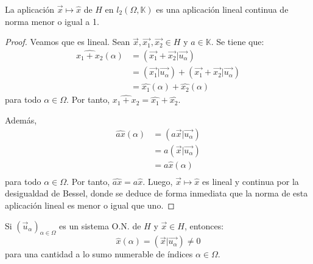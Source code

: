 \documentclass[12pt]{report}
\newcounter{it}
\theoremstyle{largebreak}
\newcommand\pint[2]{\ensuremath{\left(#1\big| #2\right)}}
\begin{document}
    \begin{cor}
        La aplicación $\vec{x}\mapsto\hat{x}$ de $H$ en $l_2(\Omega,\mathbb{K})$ es una aplicación lineal continua de norma menor o igual a 1.
    \end{cor}

    \begin{proof}
        Veamos que es lineal. Sean $\vec{x},\vec{x_1},\vec{x_2}\in H$ y $a\in\mathbb{K}$. Se tiene que:
        \begin{equation*}
            \begin{split}
                \widehat{x_1+x_2}(\alpha)&=\pint{\vec{x_1}+\vec{x_2}}{\vec{u_\alpha}}\\
                &=\pint{\vec{x_1}}{\vec{u_\alpha}}+\pint{\vec{x_1}+\vec{x_2}}{\vec{u_\alpha}}\\
                &=\hat{x_1}(\alpha)+\hat{x_2}(\alpha)
            \end{split}
        \end{equation*}
        para todo $\alpha\in\Omega$. Por tanto, $\widehat{x_1+x_2}=\hat{x_1}+\hat{x_2}$.

        Además,
        \begin{equation*}
            \begin{split}
                \widehat{a x}(\alpha)&=\pint{a\vec{x}}{\vec{u_\alpha}}\\
                &=a\pint{\vec{x}}{\vec{u_\alpha}}\\
                &=a\hat{x}(\alpha) \\
            \end{split}
        \end{equation*}
        para todo $\alpha\in\Omega$. Por tanto, $\widehat{a x}=a\hat{x}$. Luego, $\vec{x}\mapsto\hat{x}$ es lineal y continua por la desigualdad de Bessel, donde se deduce de forma inmediata que la norma de esta aplicación lineal es menor o igual que uno.
    \end{proof}
        
    \begin{cor}
        Si $(\vec{u}_\alpha)_{\alpha\in\Omega}$ es un sistema O.N. de $H$ y $\vec{x}\in H$, entonces:
        \begin{equation*}
            \hat{x}(\alpha)=\pint{\vec{x}}{\vec{u_\alpha}}\neq0
        \end{equation*}
        para una cantidad a lo sumo numerable de índices $\alpha\in\Omega$.
    \end{cor}
\end{document}
